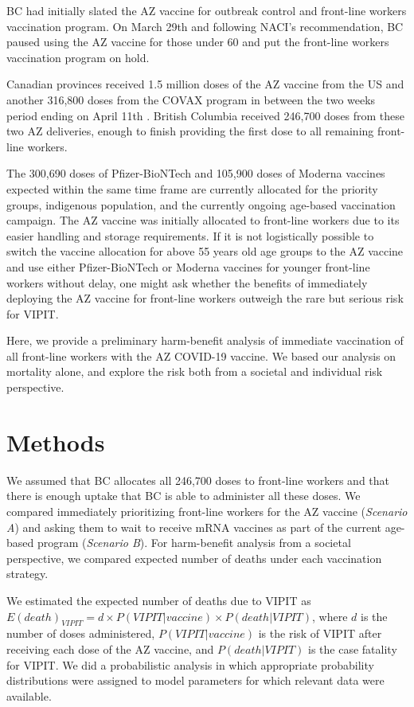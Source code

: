 \documentclass[]{interact}
\theoremstyle{plain}%
\theoremstyle{definition}
\theoremstyle{remark}
\begin{document}
BC had initially slated the AZ vaccine for outbreak control and
front-line workers vaccination program. On March 29th and following
NACI's recommendation, BC paused using the AZ vaccine for those under 60
and put the front-line workers vaccination program on hold.

Canadian provinces received 1.5 million doses of the AZ vaccine from the
US and another 316,800 doses from the COVAX program in between the two
weeks period ending on April 11th
\citep{government_of_canada_vaccines_2021}. British Columbia received
246,700 doses from these two AZ deliveries, enough to finish providing
the first dose to all remaining front-line workers.

The 300,690 doses of Pfizer-BioNTech and 105,900 doses of Moderna
vaccines expected within the same time frame are currently allocated for
the priority groups, indigenous population, and the currently ongoing
age-based vaccination campaign. The AZ vaccine was initially allocated
to front-line workers due to its easier handling and storage
requirements. If it is not logistically possible to switch the vaccine
allocation for above 55 years old age groups to the AZ vaccine and use
either Pfizer-BioNTech or Moderna vaccines for younger front-line
workers without delay, one might ask whether the benefits of immediately
deploying the AZ vaccine for front-line workers outweigh the rare but
serious risk for VIPIT.

Here, we provide a preliminary harm-benefit analysis of immediate
vaccination of all front-line workers with the AZ COVID-19 vaccine. We
based our analysis on mortality alone, and explore the risk both from a
societal and individual risk perspective.

\hypertarget{methods}{%
\section{Methods}\label{methods}}

We assumed that BC allocates all 246,700 doses to front-line workers and
that there is enough uptake that BC is able to administer all these
doses. We compared immediately prioritizing front-line workers for the
AZ vaccine (\emph{Scenario A}) and asking them to wait to receive mRNA
vaccines as part of the current age-based program (\emph{Scenario B}).
For harm-benefit analysis from a societal perspective, we compared
expected number of deaths under each vaccination strategy.

We estimated the expected number of deaths due to VIPIT as
\(E(death)_{VIPIT} = d \times P(VIPIT|vaccine) \times P(death|VIPIT)\),
where \(d\) is the number of doses administered, \(P(VIPIT|vaccine)\) is
the risk of VIPIT after receiving each dose of the AZ vaccine, and
\(P(death|VIPIT)\) is the case fatality for VIPIT. We did a
probabilistic analysis in which appropriate probability distributions
were assigned to model parameters for which relevant data were
available.
\end{document}
